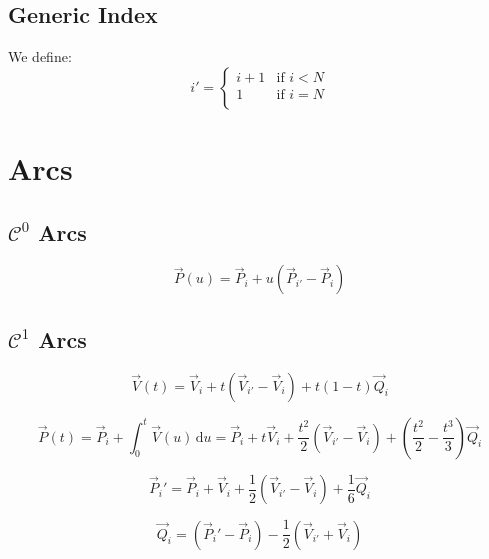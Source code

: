 \documentclass[aps,12pt]{revtex4}
\begin{document}
\subsection{Generic Index}
We define:
\begin{equation}
	i' =
	\left\lbrace
	\begin{array}{rcl}
		i+1 & \mbox{if } i<N\\
		1   & \mbox{if } i=N\\
	\end{array}
	\right.
\end{equation}


\section{Arcs}

\subsection{$\mathcal{C}^0$ Arcs}

\begin{equation}
	\vec{P}(u) = \vec{P}_i + u \left(\vec{P}_{i'} - \vec{P}_{i}\right)
\end{equation}

\subsection{$\mathcal{C}^1$ Arcs}

\begin{equation}
	\vec{V}(t) = \vec{V}_i + t \left(\vec{V}_{i'}-\vec{V}_i\right) + t(1-t) \vec{Q}_i
\end{equation}

\begin{equation}
	\vec{P}(t) = \vec{P}_i + \int_0^t \vec{V}(u) \, \mathrm{d} u 
	= \vec{P}_i + t\vec{V}_i  + \frac{t^2}{2} \left(\vec{V}_{i'}-\vec{V}_i\right) + \left(\frac{t^2}{2} - \frac{t^3}{3}\right) \vec{Q}_i
\end{equation}

\begin{equation}
	\vec{P}_i' = \vec{P}_i + \vec{V}_i  + \frac{1}{2} \left(\vec{V}_{i'}-\vec{V}_i\right) + \frac{1}{6} \vec{Q}_i
\end{equation}


\begin{equation}
	\boxed{\vec{Q}_i = \left(\vec{P}_i'-\vec{P}_i\right) - \frac{1}{2}  \left(\vec{V}_{i'}+\vec{V}_i\right)}
\end{equation}
\end{document}
